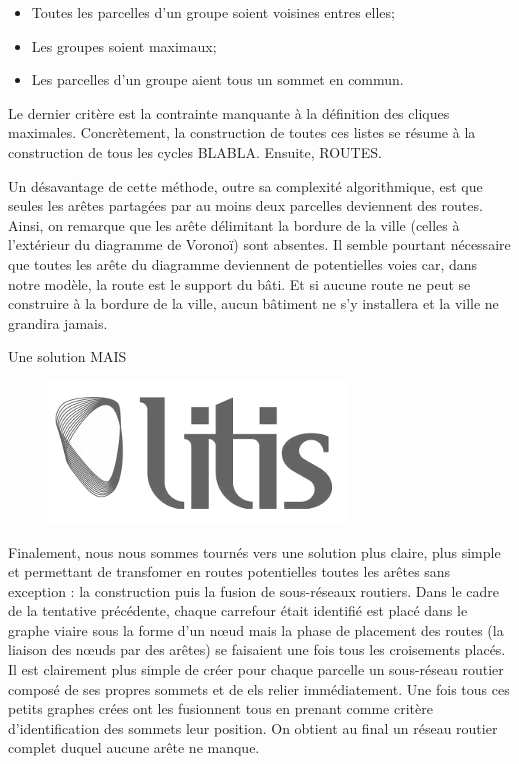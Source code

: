 \documentclass[12pt]{article}
\begin{document}
\begin{itemize}
\item{Toutes les parcelles d'un groupe soient voisines entres elles;}
\item{Les groupes soient maximaux;}
\item{Les parcelles d'un groupe aient tous un sommet en commun.}
\end{itemize}

Le dernier critère est la contrainte manquante à la définition des
cliques maximales. Concrètement, la construction de toutes ces listes
se résume à la construction de tous les cycles BLABLA. Ensuite,
ROUTES.

Un désavantage de cette méthode, outre sa complexité algorithmique,
est que seules les arêtes partagées par au moins deux parcelles
deviennent des routes. Ainsi, on remarque que les arête délimitant la
bordure de la ville (celles à l'extérieur du diagramme de Voronoï)
sont absentes. Il semble pourtant nécessaire que toutes les arête du
diagramme deviennent de potentielles voies car, dans notre modèle, la
route est le support du bâti. Et si aucune route ne peut se construire
à la bordure de la ville, aucun bâtiment ne s'y installera et la ville
ne grandira jamais.

Une solution MAIS

\begin{figure}
  \centering
  \includegraphics[width=.6\linewidth]{images/logo-litis.png}
  \caption{}
  \label{fig:construction-viaire3}
\end{figure}

Finalement, nous nous sommes tournés vers une solution plus claire,
plus simple et permettant de transfomer en routes potentielles toutes
les arêtes sans exception : la construction puis la fusion de
sous-réseaux routiers. Dans le cadre de la tentative précédente,
chaque carrefour était identifié est placé dans le graphe viaire sous
la forme d'un n\oe ud mais la phase de placement des routes (la
liaison des n\oe uds par des arêtes) se faisaient une fois tous les
croisements placés. Il est clairement plus simple de créer pour chaque
parcelle un sous-réseau routier composé de ses propres sommets et de
els relier immédiatement. Une fois tous ces petits graphes crées ont
les fusionnent tous en prenant comme critère d'identification des
sommets leur position. On obtient au final un réseau routier complet
duquel aucune arête ne manque.
\end{document}
